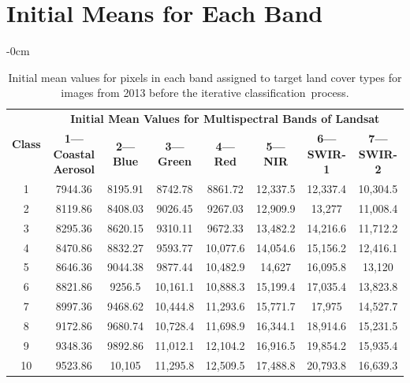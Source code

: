 \documentclass[jmse,article,accept,pdftex,oneauthor]{Definitions/mdpi}
\begin{document}
\appendixstart
\appendix

\section[\appendixname~\thesection]{Initial Means for Each Band}\label{AppA}

\vspace{-6pt}
\begin{table}[H]
\caption{Initial mean values for pixels in each band assigned to target land cover types for images from 2013 %
	before the iterative classification~process.  \label{tabA1}}

\begin{adjustwidth}{-\extralength}{0cm}
\setlength{\tabcolsep}{3.6mm}
   \begin{tabular}{cccccccc}
  \toprule
  \multirow{2}{*}{\textbf{Class}} & \multicolumn{7}{c}{\textbf{Initial Mean Values for Multispectral Bands of Landsat}} \\
     & \textbf{1---Coastal Aerosol} & \textbf{2---Blue} & \textbf{3---Green} & \textbf{4---Red} & \textbf{5---NIR} & \textbf{6---SWIR-1} & \textbf{7---SWIR-2} \\
    \midrule %
    1 & 7944.36 & 8195.91 & 8742.78 & 8861.72 & 12,337.5 & 12,337.4 & 10,304.5 \\
    2 & 8119.86 & 8408.03 & 9026.45 & 9267.03 & 12,909.9 & 13,277 & 11,008.4 \\
    3 & 8295.36 & 8620.15 & 9310.11 & 9672.33 & 13,482.2 & 14,216.6 & 11,712.2 \\
    4 & 8470.86 & 8832.27 & 9593.77 & 10,077.6 & 14,054.6 & 15,156.2 & 12,416.1 \\
    5 & 8646.36 & 9044.38 & 9877.44 & 10,482.9 & 14,627 & 16,095.8 & 13,120 \\
    6 & 8821.86 & 9256.5 & 10,161.1 & 10,888.3 & 15,199.4 &17,035.4 & 13,823.8  \\
    7 & 8997.36 & 9468.62 & 10,444.8 & 11,293.6 & 15,771.7 & 17,975 & 14,527.7 \\
    8 & 9172.86 & 9680.74 & 10,728.4 & 11,698.9 & 16,344.1 & 18,914.6 & 15,231.5 \\
    9 & 9348.36 & 9892.86 & 11,012.1 & 12,104.2 & 16,916.5 & 19,854.2 & 15,935.4 \\
    10 & 9523.86 & 10,105 & 11,295.8 & 12,509.5 & 17,488.8 & 20,793.8 & 16,639.3 \\
\bottomrule
\end{tabular}
\end{adjustwidth}
  
 
\end{table}
\unskip 
\end{document}
